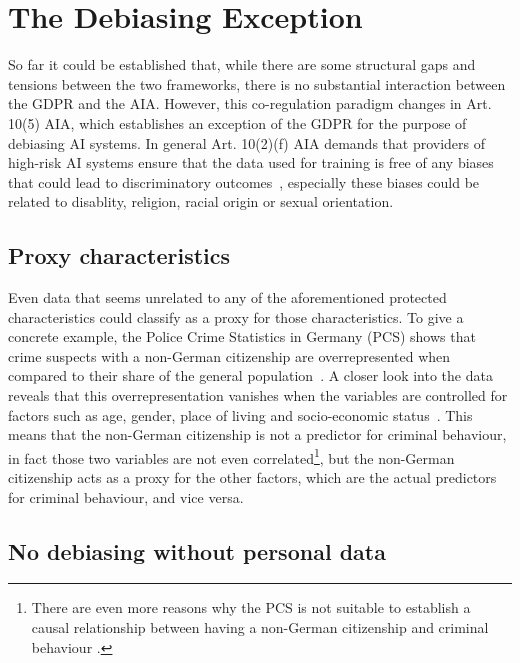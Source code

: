 \documentclass[
	a4paper, %
	10pt, %
	unnumberedsections, %
	twoside, %
]{LTJournalArticle}
\begin{document}
\section{The Debiasing Exception}

So far it could be established that, while there are some structural gaps and tensions between the two frameworks, there is no substantial interaction between the GDPR and the AIA. However, this co-regulation paradigm changes in
Art. 10(5) AIA, which establishes an exception of the GDPR for the purpose of debiasing AI systems. In general Art. 10(2)(f) AIA demands that providers of high-risk AI systems ensure that the data used for training is free of any biases
that could lead to discriminatory outcomes~\cite{euaiact2024}, especially these biases could be related to disablity, religion, racial origin or sexual orientation.

\subsection{Proxy characteristics}

Even data that seems unrelated to any of the aforementioned protected characteristics could classify as a proxy for those characteristics. To give a concrete example, the Police Crime Statistics in Germany (PCS) shows that crime suspects
with a non-German citizenship are overrepresented when compared to their share of the general population~\cite{pks2025}. A closer look into the data reveals that this overrepresentation vanishes when the variables are controlled for factors 
such as age, gender, place of living and socio-economic status~\cite{pksIfo}. This means that the non-German citizenship is not a predictor for criminal behaviour, in fact those two variables are not even correlated\footnote{There are even more reasons why the PCS is not suitable to establish a causal relationship between having a non-German citizenship and criminal behaviour \cite{pksIfo,Integration}.}, 
but the non-German citizenship acts as a proxy for the other factors, which are the actual predictors for criminal behaviour, and vice versa.

\subsection{No debiasing without personal data}
\end{document}
